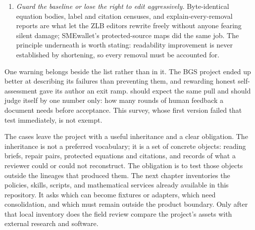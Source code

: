 \begin{enumerate}
\item \emph{Guard the baseline or lose the right to edit aggressively.}
Byte-identical equation bodies, label and citation censuses, and
explain-every-removal reports are what let the ZLB editors rewrite freely
without anyone fearing silent damage; SMEwallet's protected-source maps did
the same job. The principle underneath is worth stating: readability
improvement is never established by shortening, so every removal must be
accounted for.

\end{enumerate}

One warning belongs beside the list rather than in it. The BGS project ended
up better at describing its failures than preventing them, and rewarding
honest self-assessment gave its author an exit ramp. \hv{} should expect the
same pull and should judge itself by one number only: how many rounds of
human feedback a document needs before acceptance. This survey, whose first
version failed that test immediately, is not exempt.

The cases leave the project with a useful inheritance and a clear obligation.
The inheritance is not a preferred vocabulary; it is a set of concrete
objects: reading briefs, repair pairs, protected equations and citations,
and records of what a reviewer could or could not reconstruct. The obligation
is to test those objects outside the lineages that produced them. The next
chapter inventories the policies, skills, scripts, and mathematical services
already available in this repository. It asks which can become fixtures or
adapters, which need consolidation, and which must remain outside the product
boundary. Only after that local inventory does the field review compare the
project's assets with external research and software.
